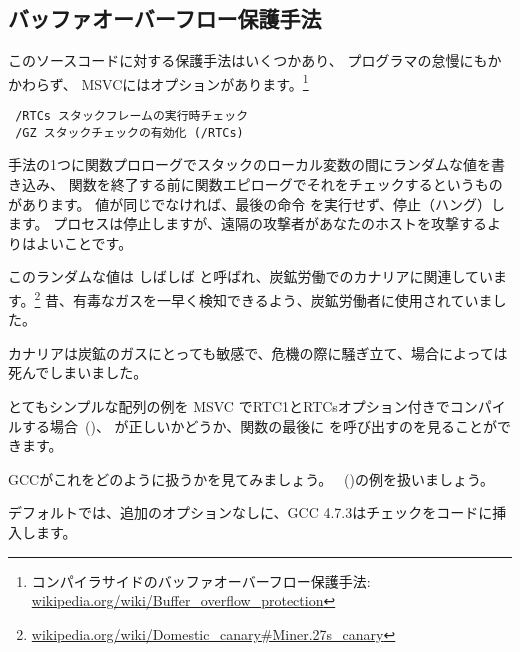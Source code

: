 ﻿\subsection{バッファオーバーフロー保護手法}
\label{subsec:BO_protection}

このソースコードに対する保護手法はいくつかあり、 \CCpp プログラマの怠慢にもかかわらず、
MSVCにはオプションがあります。\footnote{コンパイラサイドのバッファオーバーフロー保護手法:
\href{http://en.wikipedia.org/wiki/Buffer_overflow_protection}{wikipedia.org/wiki/Buffer\_overflow\_protection}}

\begin{lstlisting}
 /RTCs スタックフレームの実行時チェック
 /GZ スタックチェックの有効化 (/RTCs)
\end{lstlisting}


手法の1つに関数プロローグでスタックのローカル変数の間にランダムな値を書き込み、
関数を終了する前に関数エピローグでそれをチェックするというものがあります。
値が同じでなければ、最後の命令 \RET を実行せず、停止（ハング）します。
プロセスは停止しますが、遠隔の攻撃者があなたのホストを攻撃するよりはよいことです。

\newcommand{\CANARYURL}{\href{http://en.wikipedia.org/wiki/Domestic_Canary\#Miner.27s_canary}{wikipedia.org/wiki/Domestic\_canary\#Miner.27s\_canary}}


このランダムな値は しばしば  と呼ばれ、炭鉱労働でのカナリアに関連しています。\footnote{\CANARYURL}
昔、有毒なガスを一早く検知できるよう、炭鉱労働者に使用されていました。

カナリアは炭鉱のガスにとっても敏感で、危機の際に騒ぎ立て、場合によっては死んでしまいました。

とてもシンプルな配列の例を \ac{MSVC} でRTC1とRTCsオプション付きでコンパイルする場合~()、
が正しいかどうか、関数の最後に  を呼び出すのを見ることができます。

GCCがこれをどのように扱うかを見てみましょう。
~()の例を扱いましょう。



デフォルトでは、追加のオプションなしに、GCC 4.7.3はチェックをコードに挿入します。



